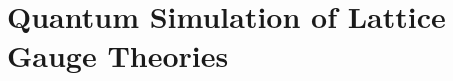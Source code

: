 \chapter{Quantum Simulation of Lattice Gauge Theories}
\label{chap:quantum_simulation_of_lattice_gauge_theories}




